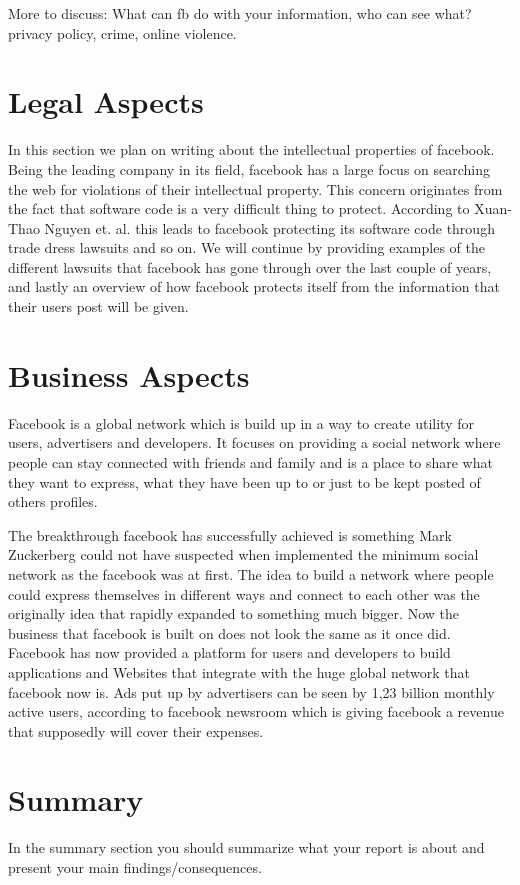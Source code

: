 \documentclass[conference]{IEEEtran}
\begin{document}
More to discuss:
What can fb do with your information, who can see what? privacy policy, crime,
online violence.

\section{Legal Aspects}
\label{legal}
In this section we plan on writing about the intellectual properties of
facebook. Being the leading company in its field, facebook has a large focus on
searching the web for violations of their intellectual property. This concern
originates from the fact that software code is a very difficult thing to
protect. According to  Xuan-Thao Nguyen et. al. this leads to facebook
protecting its software code through trade dress lawsuits and so on. We will
continue by providing examples of the different lawsuits that facebook has gone
through over the last couple of years, and lastly an overview of how facebook
protects itself from the information that their users post will be given.

\section{Business Aspects}
\label{financial}
Facebook is a global network which is build up in a way to create utility for
users, advertisers and developers. It focuses on providing a social network
where people can stay connected with friends and family and is a place to share
what they want to express, what they have been up to or just to be kept posted
of others profiles. 

The breakthrough facebook has successfully achieved is something Mark
Zuckerberg could not have suspected when implemented the minimum social network
as the facebook was at first. The idea to build a network where people could
express themselves in different ways and connect to each other was the
originally idea that rapidly expanded to something much bigger. Now the
business that facebook is built on does not look the same as it once did.
Facebook has now provided a platform for users and developers to build
applications and Websites that integrate with the huge global network that
facebook now is. Ads put up by advertisers can be seen by 1,23 billion monthly
active users, according to facebook newsroom which is giving facebook a revenue
that supposedly will cover their expenses.

\section{Summary}
In the summary section you should summarize what your report is about and
present your main findings/consequences. 
\end{document}
